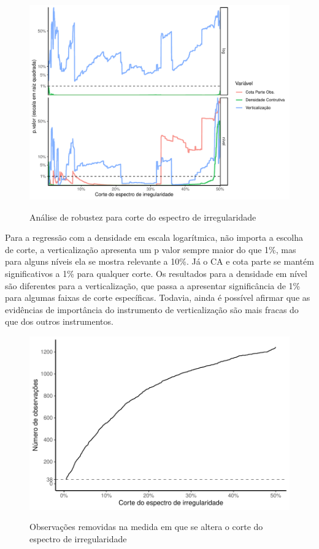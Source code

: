 \begin{apendicesenv}
\begin{figure}[h]
    \centering
    \caption{Análise de robustez para corte do espectro de irregularidade}
    \includegraphics[width = \linewidth]{imagens/pvals.pdf}
    \label{fig:pvals}
\end{figure}

Para a regressão com a densidade em escala logarítmica, não importa a escolha de corte, a verticalização apresenta um p valor sempre maior do que 1\%, mas para alguns níveis ela se mostra relevante a 10\%. Já o CA e cota parte se mantém significativos a 1\% para qualquer corte. Os resultados para a densidade em nível são diferentes para a verticalização, que passa a apresentar significância de 1\% para algumas faixas de corte específicas. Todavia, ainda é possível afirmar que as evidências de importância do instrumento de verticalização são mais fracas do que dos outros instrumentos.

\begin{figure}[h]
    \centering
    \caption{Observações removidas na medida em que se altera o corte do espectro de irregularidade}
    \includegraphics[width = .75\linewidth]{imagens/nobs.pdf}
    \label{fig:nobs}
\end{figure}



\end{apendicesenv}
    
    